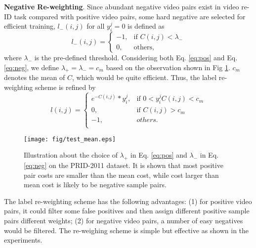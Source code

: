 \documentclass[10pt,twocolumn,letterpaper]{article}
\begin{document}
\textbf{Negative Re-weighting}. Since abundant negative video pairs exist in video re-ID task compared with positive video pairs, some hard negative are selected for efficient training, $l_-(i,j)$ for all $y_i^j =0$ is defined as
\begin{equation}\label{eq:neg}
l_-(i,j) = \left\{ {\begin{array}{ll}
 {-1 ,} & {\textrm{if $C(i,j) < \lambda_- $}}\\
{0,}   & {\textrm{others,}}
\end{array}} \right.
\end{equation}
where $\lambda_-$ is the pre-defined threshold. Considering both Eq. \ref{eq:pos} and Eq. \ref{eq:neg}, we define $\lambda_+ = \lambda_- = c_m$ based on the observation shown in Fig \ref{fig:mean}. $c_m$ denotes the mean of $C$, which would be quite efficient. Thus, the label re-weighting scheme is refined by
\begin{equation}\label{eq:rew}
l(i,j) = \left\{ {\begin{array}{ll}
{e^{-C(i,j)} * y_i^j,} & {\textrm{if $0 < y_i^jC(i,j) <   c_m $}}\\
{ 0, } &{\textrm{if $C(i,j) > c_m $}}\\
{ -1, } &{\textrm{$others $}.}\\
\end{array}} \right.
\end{equation}
\begin{figure}[t]
  \centering
  \texttt{[image: fig/test\_mean.eps]}\\
  \caption{\small{Illustration about the choice of $\lambda_+$ in Eq. \ref{eq:pos} and $\lambda_-$ in Eq. \ref{eq:neg} on the PRID-2011 dataset. It is shown that most positive pair costs are smaller than the mean cost, while cost larger than mean cost is likely to be negative sample pairs. }}\label{fig:mean}
\end{figure}
The label re-weighting scheme has the following advantages: (1) for positive video pairs, it could filter some false positives and then assign different positive sample pairs different weights; (2) for negative video pairs, a number of easy negatives would be filtered. The re-weighing scheme is simple but effective as shown in the experiments.
\end{document}
